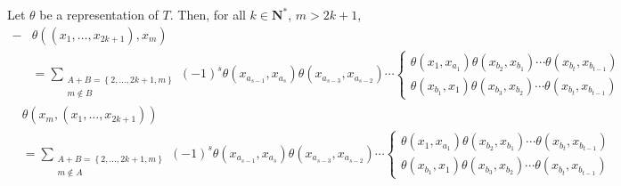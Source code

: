 \documentclass[11pt, twoside]{article}
\begin{document}
\begin{lem}\label{lemcalc}
Let $\theta$ be a representation of $T$. Then, for all $k\in \mathbf{N}^* $, $m>2k+1 $,
    \begin{align*}
        -&\theta((x_1,\ldots,x_{2k+1}),x_m)\\ &= \sum_{\substack{A+B=\left\{2,\ldots,2k+1,m\right\}\\ m\notin B}}(-1)^s\theta(x_{a_{s-1}},x_{a_s})\theta(x_{a_{s-3}},x_{a_{s-2}})\cdots \left\{\begin{matrix}
\theta (x_1,x_{a_1})\theta(x_{b_2},x_{b_1})\cdots\theta(x_{b_t},x_{b_{t-1}}) \\\theta (x_{b_1},x_1)\theta(x_{b_3},x_{b_2})\cdots\theta(x_{b_t},x_{b_{t-1}})
\end{matrix}\right. \end{align*} 
\begin{align*}
    &\theta(x_m,(x_1,\ldots,x_{2k+1}))\\ &= \sum_{\substack{A+B=\left\{2,\ldots,2k+1,m\right\}\\ m\notin A}}(-1)^s\theta(x_{a_{s-1}},x_{a_s})\theta(x_{a_{s-3}},x_{a_{s-2}})\cdots \left\{\begin{matrix}
\theta (x_1,x_{a_1})\theta(x_{b_2},x_{b_1})\cdots\theta(x_{b_{t}},x_{b_{t-1}}) \\\theta (x_{b_1},x_1)\theta(x_{b_3},x_{b_2})\cdots\theta(x_{b_t},x_{b_{t-1}})
\end{matrix}\right. \end{align*}
\end{lem}
\end{document}
